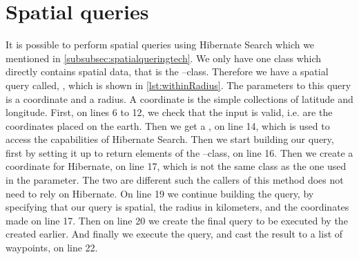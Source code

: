 \section{Spatial queries}\label{subsubsec:spatial}
It is possible to perform spatial queries using Hibernate Search which we mentioned in \cref{subsubsec:spatialqueringtech}.
We only have one class which directly contains spatial data, that is the --class.
Therefore we have a spatial query called, , which is shown in \cref{lst:withinRadius}.
The parameters to this query is a coordinate and a radius.
A coordinate is the simple collections of latitude and longitude.
First, on lines 6 to 12, we check that the input is valid, i.e. are the coordinates placed on the earth.
Then we get a , on line 14, which is used to access the capabilities of Hibernate Search.
Then we start building our query, first by setting it up to return elements of the --class, on line 16.
Then we create a coordinate for Hibernate, on line 17, which is not the same class as the one used in the parameter.
The two are different such the callers of this method does not need to rely on Hibernate.
On line 19 we continue building the query, by specifying that our query is spatial, the radius in kilometers, and the coordinates made on line 17.
Then on line 20 we create the final query to be executed by the  created earlier.
And finally we execute the query, and cast the result to a list of waypoints, on line 22.
